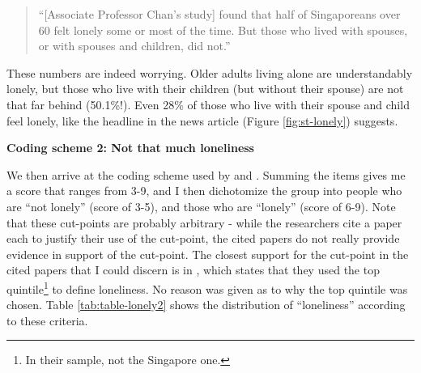 \documentclass[
  openany]{book}
\begin{document}
\begin{quote}
``{[}Associate Professor Chan's study{]} found that half of Singaporeans over 60 felt lonely some or most of the time. But those who lived with spouses, or with spouses and children, did not.''
\end{quote}

These numbers are indeed worrying. Older adults living alone are understandably lonely, but those who live with their children (but without their spouse) are not that far behind (50.1\%!). Even 28\% of those who live with their spouse and child feel lonely, like the headline in the news article (Figure \ref{fig:st-lonely}) suggests.

\textbf{Coding scheme 2: Not that much loneliness}

We then arrive at the coding scheme used by \citet{wee_loneliness_2019} and \citet{ge_social_2017}. Summing the items gives me a score that ranges from 3-9, and I then dichotomize the group into people who are ``not lonely'' (score of 3-5), and those who are ``lonely'' (score of 6-9). Note that these cut-points are probably arbitrary - while the researchers cite a paper each to justify their use of the cut-point, the cited papers do not really provide evidence in support of the cut-point. The closest support for the cut-point in the cited papers that I could discern is in \citet{steptoe_social_2013}, which states that they used the top quintile\footnote{In their sample, not the Singapore one.} to define loneliness. No reason was given as to why the top quintile was chosen. Table \ref{tab:table-lonely2} shows the distribution of ``loneliness'' according to these criteria.
\end{document}
